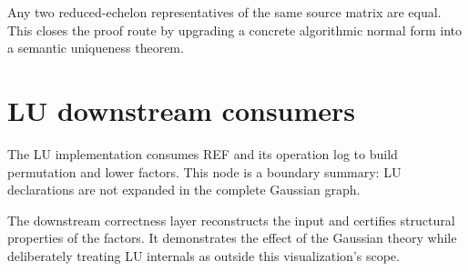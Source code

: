 \begin{theorem}
\label{thm:semantic-rref-uniqueness}
\leanok
{}
Any two reduced-echelon representatives of the same source matrix are equal.  This closes the
proof route by upgrading a concrete algorithmic normal form into a semantic uniqueness theorem.
\end{theorem}

\chapter{LU downstream consumers}

\begin{definition}
\label{def:lu-factorization-boundary}
\leanok
{}
The LU implementation consumes REF and its operation log to build permutation and lower factors.
This node is a boundary summary: LU declarations are not expanded in the complete Gaussian
graph.
\end{definition}

\begin{theorem}
\label{thm:lu-correctness-boundary}
\leanok
{}
The downstream correctness layer reconstructs the input and certifies structural properties of
the factors.  It demonstrates the effect of the Gaussian theory while deliberately treating LU
internals as outside this visualization's scope.
\end{theorem}
